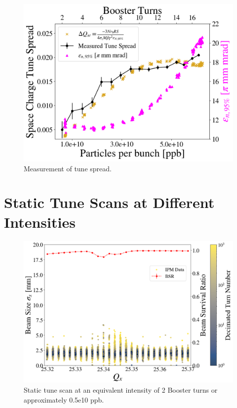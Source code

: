 
\begin{figure}[H]
    \centering
    \includegraphics[width=\columnwidth]{chapter6/tune_spread.png}
    \caption{Measurement of tune spread.}
    \label{fig:tunespread}
\end{figure}

\section{Static Tune Scans at Different Intensities}

\begin{figure}[H]
    \centering
    \includegraphics[width=\columnwidth]{chapter6/static2turns_dampersOFF.png}
    \caption{Static tune scan at an equivalent intensity of 2 Booster turns or approximately 0.5e10 ppb.}
    \label{fig:static2_scatter}
\end{figure}

